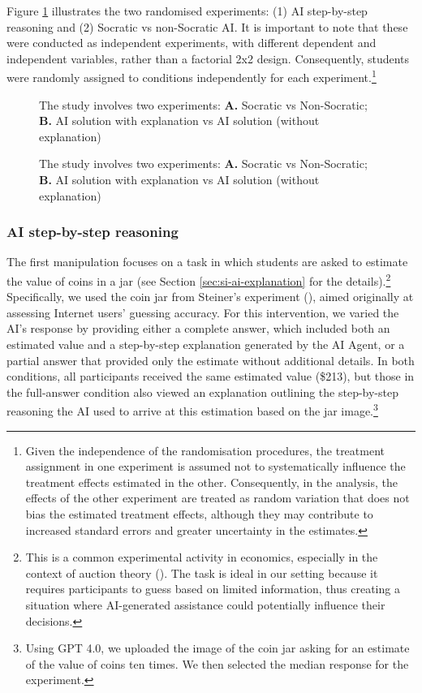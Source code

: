 \documentclass[
  12pt,
]{article}
\begin{document}
Figure \ref{fig:design} illustrates the two randomised experiments: (1) AI step-by-step reasoning and (2) Socratic vs non-Socratic AI. It is important to note that these were conducted as independent experiments, with different dependent and independent variables, rather than a factorial 2x2 design. Consequently, students were randomly assigned to conditions independently for each experiment.\footnote{
  Given the independence of the randomisation procedures, the treatment assignment in one experiment is assumed not to systematically influence the treatment effects estimated in the other. Consequently, in the analysis, the effects of the other experiment are treated as random variation that does not bias the estimated treatment effects, although they may contribute to increased standard errors and greater uncertainty in the estimates.}

\begin{figure}
\centering
{\label{fig:design}The study involves two experiments: \textbf{A.} Socratic vs Non-Socratic; \textbf{B.} AI solution with explanation vs AI solution (without explanation)}
\caption{\label{fig:design}The study involves two experiments: \textbf{A.} Socratic vs Non-Socratic; \textbf{B.} AI solution with explanation vs AI solution (without explanation)}
\end{figure}

\subsubsection{AI step-by-step reasoning}\label{ai-step-by-step-reasoning}

The first manipulation focuses on a task in which students are asked to estimate the value of coins in a jar (see Section \ref{sec:si-ai-explanation} for the details).\footnote{This is a common experimental activity in economics, especially in the context of auction theory (). The task is ideal in our setting because it requires participants to guess based on limited information, thus creating a situation where AI-generated assistance could potentially influence their decisions.} Specifically, we used the coin jar from Steiner's experiment (), aimed originally at assessing Internet users' guessing accuracy. For this intervention, we varied the AI's response by providing either a complete answer, which included both an estimated value and a step-by-step explanation generated by the AI Agent, or a partial answer that provided only the estimate without additional details. In both conditions, all participants received the same estimated value (\$213), but those in the full-answer condition also viewed an explanation outlining the step-by-step reasoning the AI used to arrive at this estimation based on the jar image.\footnote{Using GPT 4.0, we uploaded the image of the coin jar asking for an estimate of the value of coins ten times. We then selected the median response for the experiment.}
\end{document}
